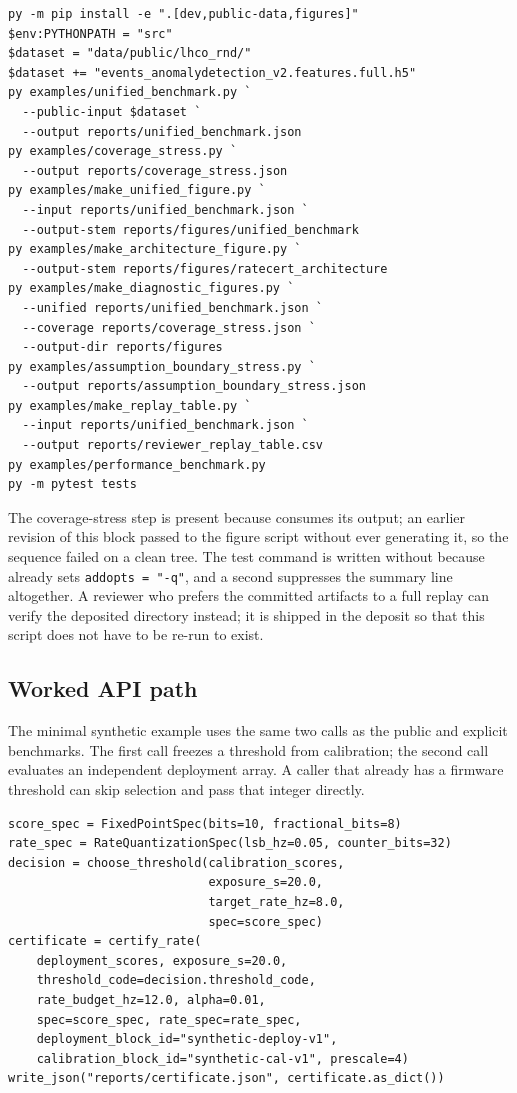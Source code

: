 \documentclass[preprint,12pt]{elsarticle}
\begin{document}
\begin{verbatim}
py -m pip install -e ".[dev,public-data,figures]"
$env:PYTHONPATH = "src"
$dataset = "data/public/lhco_rnd/"
$dataset += "events_anomalydetection_v2.features.full.h5"
py examples/unified_benchmark.py `
  --public-input $dataset `
  --output reports/unified_benchmark.json
py examples/coverage_stress.py `
  --output reports/coverage_stress.json
py examples/make_unified_figure.py `
  --input reports/unified_benchmark.json `
  --output-stem reports/figures/unified_benchmark
py examples/make_architecture_figure.py `
  --output-stem reports/figures/ratecert_architecture
py examples/make_diagnostic_figures.py `
  --unified reports/unified_benchmark.json `
  --coverage reports/coverage_stress.json `
  --output-dir reports/figures
py examples/assumption_boundary_stress.py `
  --output reports/assumption_boundary_stress.json
py examples/make_replay_table.py `
  --input reports/unified_benchmark.json `
  --output reports/reviewer_replay_table.csv
py examples/performance_benchmark.py
py -m pytest tests
\end{verbatim}

The coverage-stress step is present because 
consumes its output; an earlier revision of this block passed
 to the figure script without ever generating
it, so the sequence failed on a clean tree.  The test command is written without
 because  already sets \texttt{addopts = "-q"}, and
a second  suppresses the summary line altogether.  A reviewer who
prefers the committed artifacts to a full replay can verify the deposited
 directory instead; it is shipped in the deposit so that this
script does not have to be re-run to exist.

\subsection{Worked API path}

The minimal synthetic example uses the same two calls as the public and
explicit benchmarks.  The first call freezes a threshold from calibration; the
second call evaluates an independent deployment array.  A caller that already
has a firmware threshold can skip selection and pass that integer directly.

\begin{verbatim}
score_spec = FixedPointSpec(bits=10, fractional_bits=8)
rate_spec = RateQuantizationSpec(lsb_hz=0.05, counter_bits=32)
decision = choose_threshold(calibration_scores,
                            exposure_s=20.0,
                            target_rate_hz=8.0,
                            spec=score_spec)
certificate = certify_rate(
    deployment_scores, exposure_s=20.0,
    threshold_code=decision.threshold_code,
    rate_budget_hz=12.0, alpha=0.01,
    spec=score_spec, rate_spec=rate_spec,
    deployment_block_id="synthetic-deploy-v1",
    calibration_block_id="synthetic-cal-v1", prescale=4)
write_json("reports/certificate.json", certificate.as_dict())
\end{verbatim}
\end{document}
